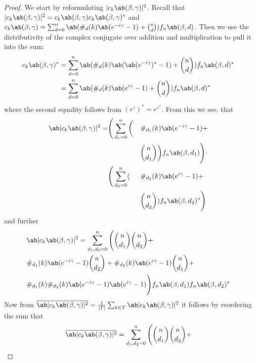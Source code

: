 \begin{proof}
    We start by reformulating $|c_k \ab(\mangle, \pangle)|^2$. Recall that $|c_k \ab(\mangle, \pangle)|^2 = c_k \ab(\mangle, \pangle) c_k \ab(\mangle, \pangle)^*$ and $c_k \ab(\mangle, \pangle) = \sum_{d = 0}^n \ab(\#_d (k) \ab(e^{-i \pangle} - 1) + \binom{n}{d}) f_n \ab(\mangle, d)$. Then we use the distributivity of the complex conjugate over addition and multiplication to pull it into the sum:
    \begin{displaymath}
    \begin{aligned}
        c_k \ab(\mangle, \pangle)^* &= \sum_{d = 0}^n \ab(\#_d (k) \ab(\ab(e^{-i \pangle})^* - 1) + \binom{n}{d}) f_n \ab(\mangle, d)^* \\
                                    &= \sum_{d = 0}^n \ab(\#_d (k) \ab(e^{i \pangle} - 1) + \binom{n}{d}) f_n \ab(\mangle, d)^*
    \end{aligned}
    \end{displaymath}
    where the second equality follows from $(e^z)^* = e^{z^*}$. From this we see, that
    \begin{alignat*}{2}
    \ab|c_k \ab(\mangle, \pangle)|^2 = &\Bigg(\sum_{d_1 = 0}^n \bigg(&&\#_{d_1} (k) \ab(e^{-i \pangle} - 1) + \\
                                                         & &&\binom{n}{d_1}\bigg) f_n \ab(\mangle, d_1)\Bigg) \cdot \\
                                           &\Bigg(\sum_{d_2 = 0}^n (&&\#_{d_2} (k) \ab(e^{i \pangle} - 1) + \\
                                                         & &&\binom{n}{d_2}) f_n \ab(\mangle, d_2)^*\Bigg) 
    \end{alignat*}
    and further
    \begin{align*}
        &\ab|c_k \ab(\mangle, \pangle)|^2 = \sum_{d_1, d_2 = 0}^n \Bigg( \binom{n}{d_1} \binom{n}{d_2} + \\
        &\#_{d_1} (k) \ab(e^{-i \pangle} - 1) \binom{n}{d_2} +  \#_{d_2} (k) \ab(e^{i \pangle} - 1) \binom{n}{d_1} + \\
        &\#_{d_1} (k) \#_{d_2} (k) \ab(e^{-i \pangle} - 1) \ab(e^{i \pangle} - 1) \Bigg) f_n \ab(\mangle, d_1) f_n \ab(\mangle, d_2)^*
    \end{align*}
    Now from $\overline{\ab|c_k \ab(\mangle, \pangle)|^2} = \frac{1}{|T|} \sum_{k \in T} \ab|c_k \ab(\mangle, \pangle)|^2$ it follows by reordering the sum that
    \begin{align*}
        &\overline{\ab|c_k \ab(\mangle, \pangle)|^2} = \sum_{d_1, d_2 = 0}^n \Bigg(\binom{n}{d_1} \binom{n}{d_2} + \\

\end{align*}
\end{proof}
